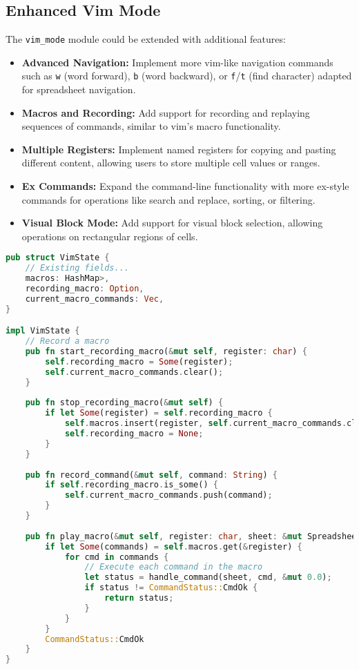 \documentclass[11pt,a4paper]{article}
\begin{document}
\subsection{Enhanced Vim Mode}

The \lstinline{vim_mode} module could be extended with additional features:

\begin{itemize}
  \item \textbf{Advanced Navigation:} Implement more vim-like navigation commands such as \lstinline{w} (word forward), \lstinline{b} (word backward), or \lstinline{f}/\lstinline{t} (find character) adapted for spreadsheet navigation.
  
  \item \textbf{Macros and Recording:} Add support for recording and replaying sequences of commands, similar to vim's macro functionality.
  
  \item \textbf{Multiple Registers:} Implement named registers for copying and pasting different content, allowing users to store multiple cell values or ranges.
  
  \item \textbf{Ex Commands:} Expand the command-line functionality with more ex-style commands for operations like search and replace, sorting, or filtering.
  
  \item \textbf{Visual Block Mode:} Add support for visual block selection, allowing operations on rectangular regions of cells.
\end{itemize}

\begin{lstlisting}[language=Rust, caption={Potential implementation of vim macros}, label=lst:vim-macros]
pub struct VimState {
    // Existing fields...
    macros: HashMap>,
    recording_macro: Option,
    current_macro_commands: Vec,
}

impl VimState {
    // Record a macro
    pub fn start_recording_macro(&mut self, register: char) {
        self.recording_macro = Some(register);
        self.current_macro_commands.clear();
    }
    
    pub fn stop_recording_macro(&mut self) {
        if let Some(register) = self.recording_macro {
            self.macros.insert(register, self.current_macro_commands.clone());
            self.recording_macro = None;
        }
    }
    
    pub fn record_command(&mut self, command: String) {
        if self.recording_macro.is_some() {
            self.current_macro_commands.push(command);
        }
    }
    
    pub fn play_macro(&mut self, register: char, sheet: &mut Spreadsheet) -> CommandStatus {
        if let Some(commands) = self.macros.get(&register) {
            for cmd in commands {
                // Execute each command in the macro
                let status = handle_command(sheet, cmd, &mut 0.0);
                if status != CommandStatus::CmdOk {
                    return status;
                }
            }
        }
        CommandStatus::CmdOk
    }
}
\end{lstlisting}
\end{document}
